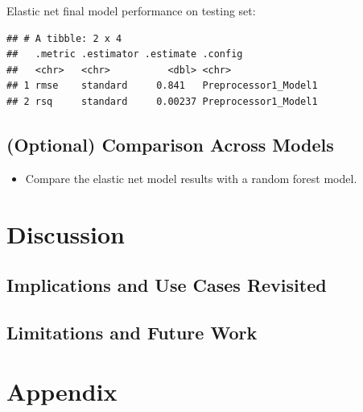 \documentclass[sn-basic,pdflatex]{sn-jnl}
\providecommand{\tightlist}{%
  \setlength{\itemsep}{0pt}\setlength{\parskip}{0pt}}
\begin{document}
Elastic net final model performance on testing set:

\begin{verbatim}
## # A tibble: 2 x 4
##   .metric .estimator .estimate .config             
##   <chr>   <chr>          <dbl> <chr>               
## 1 rmse    standard     0.841   Preprocessor1_Model1
## 2 rsq     standard     0.00237 Preprocessor1_Model1
\end{verbatim}

\subsection{(Optional) Comparison Across
Models}\label{optional-comparison-across-models}

\begin{itemize}
\tightlist
\item
  Compare the elastic net model results with a random forest model.
\end{itemize}

\section{Discussion}\label{discussion}

\subsection{Implications and Use Cases
Revisited}\label{implications-and-use-cases-revisited}

\subsection{Limitations and Future
Work}\label{limitations-and-future-work}

\section{Appendix}\label{appendix}

~


\end{document}
